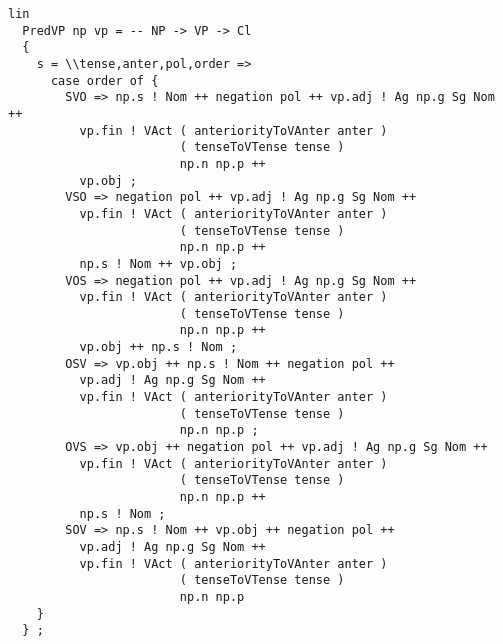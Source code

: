 \begin{lstlisting}[float=ht,caption={\texttt{PredVP}-Regel zur Kombination einer \texttt{NP} und einer \texttt{VP} zu einer \texttt{Cl}},basicstyle=\small,label={GF-Sentence-PredVP}]
lin
  PredVP np vp = -- NP -> VP -> Cl
  {
    s = \\tense,anter,pol,order => 
      case order of {
        SVO => np.s ! Nom ++ negation pol ++ vp.adj ! Ag np.g Sg Nom ++ 
          vp.fin ! VAct ( anteriorityToVAnter anter ) 
                        ( tenseToVTense tense ) 
                        np.n np.p ++
          vp.obj ;
        VSO => negation pol ++ vp.adj ! Ag np.g Sg Nom ++ 
          vp.fin ! VAct ( anteriorityToVAnter anter ) 
                        ( tenseToVTense tense ) 
                        np.n np.p ++ 
          np.s ! Nom ++ vp.obj ;
        VOS => negation pol ++ vp.adj ! Ag np.g Sg Nom ++ 
          vp.fin ! VAct ( anteriorityToVAnter anter ) 
                        ( tenseToVTense tense ) 
                        np.n np.p ++ 
          vp.obj ++ np.s ! Nom ;
        OSV => vp.obj ++ np.s ! Nom ++ negation pol ++ 
          vp.adj ! Ag np.g Sg Nom ++ 
          vp.fin ! VAct ( anteriorityToVAnter anter ) 
                        ( tenseToVTense tense ) 
                        np.n np.p ;
        OVS => vp.obj ++ negation pol ++ vp.adj ! Ag np.g Sg Nom ++
          vp.fin ! VAct ( anteriorityToVAnter anter ) 
                        ( tenseToVTense tense ) 
                        np.n np.p ++ 
          np.s ! Nom ;
        SOV => np.s ! Nom ++ vp.obj ++ negation pol ++ 
          vp.adj ! Ag np.g Sg Nom ++ 
          vp.fin ! VAct ( anteriorityToVAnter anter ) 
                        ( tenseToVTense tense ) 
                        np.n np.p 
    }
  } ;
\end{lstlisting}
